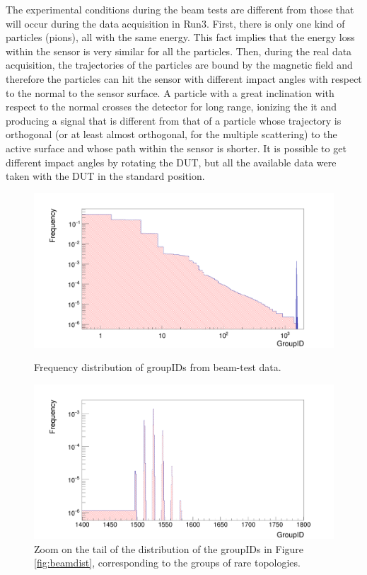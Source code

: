 The experimental conditions during the beam tests are different from those that will occur during the data acquisition in Run3. First, there is only one kind of particles (pions), all with the same energy. This fact implies that the energy loss within the sensor is very similar for all the particles. Then, during the real data acquisition, the trajectories of the particles are bound by the magnetic field and therefore the particles can hit the sensor with different impact angles with respect to the normal to the sensor surface. A particle with a great inclination with respect to the normal crosses the detector for long range, ionizing the it and producing a signal that is different from that of a particle whose trajectory is orthogonal (or at least almost orthogonal, for the multiple scattering) to the active surface and whose path within the sensor is shorter. It is possible to get different impact angles by rotating the DUT, but all the available data were taken with the DUT in the standard position.\\
%
\begin{figure}
  \centering
  \includegraphics[scale=0.2]{figures/beamdist.png}
  \caption{Frequency distribution of groupIDs from beam-test data.}
  \label{fig:beamdist}
  \centering
  \includegraphics[scale=0.2]{figures/beamzoom.png}
  \caption{Zoom on the tail of the distribution of the groupIDs in Figure \ref{fig:beamdist}, corresponding to the groups of rare topologies.}
  \label{fig:beamzoom}
\end{figure}
